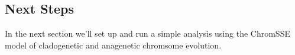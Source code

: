 \subsection{Next Steps}


In the next section we'll set up and run a simple \RevBayes analysis using the ChromSSE model
of cladogenetic and anagenetic chromsome evolution.


\newpage
